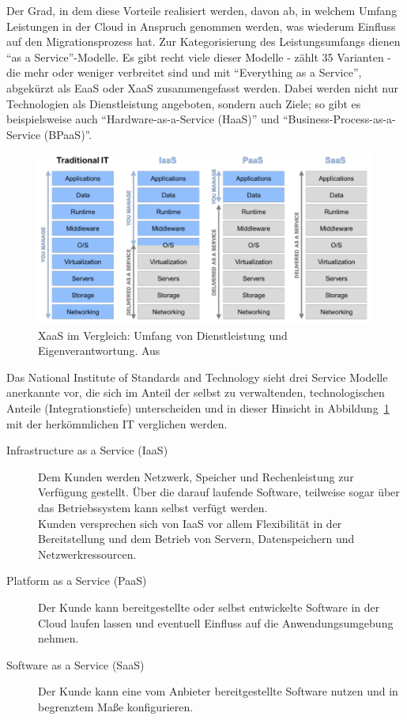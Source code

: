 Der Grad, in dem diese Vorteile realisiert werden, davon ab, 
in welchem Umfang Leistungen in der Cloud in Anspruch genommen werden, was 
wiederum Einfluss auf den Migrationsprozess hat. Zur 
Kategorisierung des Leistungsumfangs dienen "`as a Service"'-Modelle. Es
gibt recht viele dieser Modelle -  zählt 35
Varianten - die mehr oder weniger verbreitet sind und mit "`Everything as a
Service"', abgekürzt als EaaS oder XaaS zusammengefasst werden. Dabei werden
nicht nur Technologien als Dienstleistung angeboten, sondern auch Ziele; so gibt
es beispielsweise auch "`Hardware-as-a-Service (HaaS)"' und
"`Business-Process-as-a-Service (BPaaS)"'.
\begin{figure}%
\begin{center}
\includegraphics[width=\textwidth]{images/XaaS_im_Vergleich.png}
\caption{XaaS im Vergleich: Umfang von
Dienstleistung und Eigenverantwortung. Aus
\protect{} }
\label{fig:xaas_im_vergleich}
\end{center}
\end{figure}

Das National Institute of Standards and Technology sieht drei
Service Modelle anerkannte vor, die sich im Anteil der
selbst zu verwaltenden, technologischen Anteile (Integrationstiefe)
unterscheiden und in dieser Hinsicht in Abbildung~\ref{fig:xaas_im_vergleich}
mit der herkömmlichen IT verglichen werden.  
\begin{description}
	\item[Infrastructure as a Service (IaaS)] Dem Kunden werden Netzwerk,
Speicher und Rechenleistung zur Verfügung gestellt. Über die darauf laufende
Software, teilweise sogar über das Betriebssystem kann selbst verfügt werden. \\
Kunden versprechen sich von IaaS vor allem Flexibilität in der Bereitstellung
und dem Betrieb von Servern, Datenspeichern und Netzwerkressourcen.
	\item[Platform as a Service (PaaS)] Der Kunde kann bereitgestellte
oder selbst entwickelte Software in der Cloud laufen lassen und eventuell
Einfluss auf die Anwendungsumgebung nehmen. 
	\item[Software as a Service (SaaS)] Der Kunde kann eine vom Anbieter
bereitgestellte Software nutzen und in begrenztem Maße konfigurieren.
\end{description}

